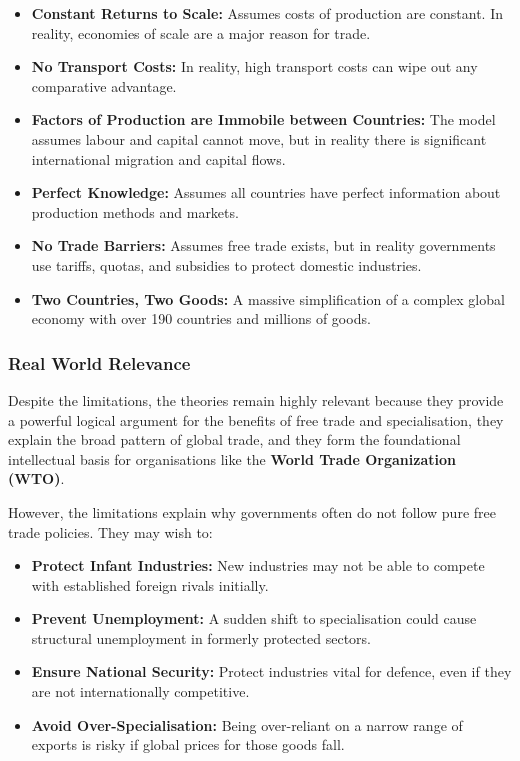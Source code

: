 \documentclass[11pt, a4paper, twoside]{book}
\begin{document}
\begin{itemize}
  \item \textbf{Constant Returns to Scale:} Assumes costs of production are constant. In reality, economies of scale are a major reason for trade.
  \item \textbf{No Transport Costs:} In reality, high transport costs can wipe out any comparative advantage.
  \item \textbf{Factors of Production are Immobile between Countries:} The model assumes labour and capital cannot move, but in reality there is significant international migration and capital flows.
  \item \textbf{Perfect Knowledge:} Assumes all countries have perfect information about production methods and markets.
  \item \textbf{No Trade Barriers:} Assumes free trade exists, but in reality governments use tariffs, quotas, and subsidies to protect domestic industries.
  \item \textbf{Two Countries, Two Goods:} A massive simplification of a complex global economy with over 190 countries and millions of goods.
\end{itemize}

\subsubsection{Real World Relevance}

Despite the limitations, the theories remain highly relevant because they provide a powerful logical argument for the benefits of free trade and specialisation, they explain the broad pattern of global trade, and they form the foundational intellectual basis for organisations like the \textbf{World Trade Organization (WTO)}.

However, the limitations explain why governments often do not follow pure free trade policies. They may wish to:
\begin{itemize}
  \item \textbf{Protect Infant Industries:} New industries may not be able to compete with established foreign rivals initially.
  \item \textbf{Prevent Unemployment:} A sudden shift to specialisation could cause structural unemployment in formerly protected sectors.
  \item \textbf{Ensure National Security:} Protect industries vital for defence, even if they are not internationally competitive.
  \item \textbf{Avoid Over-Specialisation:} Being over-reliant on a narrow range of exports is risky if global prices for those goods fall.
\end{itemize}
\end{document}
